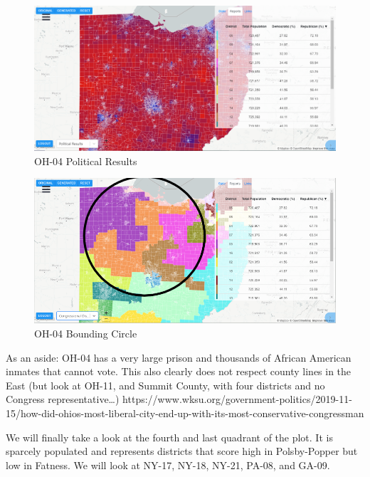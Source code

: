 \documentclass[letterpaper]{article}
\begin{document}
\begin{figure}[H]
	\includegraphics[width=\linewidth]{./figures/OH-04-SurroundingArea.png}
	\caption{OH-04 Political Results}
	\label{fig:oh04political}
\end{figure}

\begin{figure}[H]
	\includegraphics[width=\linewidth]{./figures/OH-04-BoundingCircle.png}
	\caption{OH-04 Bounding Circle}
	\label{fig:oh04boundingCircle}
\end{figure}


As an aside: OH-04 has a very large prison and thousands of African American inmates that cannot vote. This also clearly does not respect county lines in the East (but look at OH-11, and Summit County, with four districts and no Congress representative…)
https://www.wksu.org/government-politics/2019-11-15/how-did-ohios-most-liberal-city-end-up-with-its-most-conservative-congressman

We will finally take a look at the fourth and last quadrant of the plot. It is sparcely populated and represents districts that score high in Polsby-Popper but low in Fatness. We will look at NY-17, NY-18, NY-21, PA-08, and GA-09.
\end{document}
